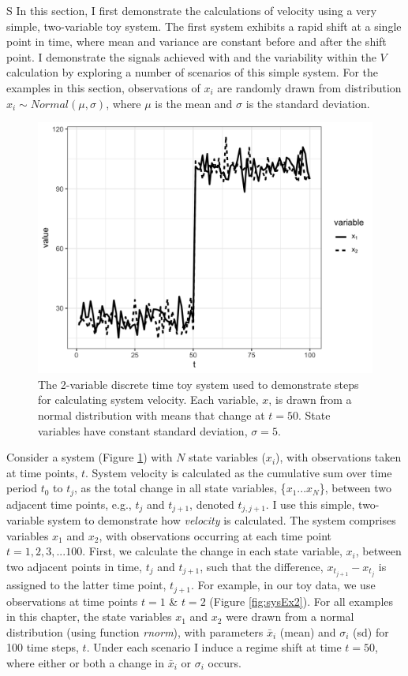 \documentclass[print]{nuthesis}
\begin{document}
S
In this section, I first demonstrate the calculations of velocity using a very simple, two-variable toy system. The first system exhibits a rapid shift at a single point in time, where mean and variance are constant before and after the shift point. I demonstrate the signals achieved with and the variability within the \(V\) calculation by exploring a number of scenarios of this simple system. For the examples in this section, observations of \(x_i\) are randomly drawn from distribution \(x_i\sim Normal(\mu, \sigma)\), where \(\mu\) is the mean and \(\sigma\) is the standard deviation.
\begin{figure}
\includegraphics[width=0.85\linewidth]{./chapterFiles/velocity/figsCalledInDiss/sysEx} \caption{The 2-variable discrete time toy system used to demonstrate steps for calculating system velocity. Each variable, $x$, is drawn from a normal distribution with means that change at $t = 50$. State variables have constant standard deviation, $\sigma = 5$.}\label{fig:sysEx}
\end{figure}
Consider a system (Figure \ref{fig:sysEx}) with \(N\) state variables (\(x_i\)), with observations taken at time points, \(t\). System velocity is calculated as the cumulative sum over time period \(t_0\) to \(t_j\), as the total change in all state variables, \{\(x_1 ...x_N\)\}, between two adjacent time points, e.g., \(t_j\) and \(t_{j+1}\), denoted \(t_{j,j+1}\). I use this simple, two-variable system to demonstrate how \emph{velocity} is calculated. The system comprises variables \(x_1\) and \(x_2\), with observations occurring at each time point \(t = {1,2,3,...100}\). First, we calculate the change in each state variable, \(x_i\), between two adjacent points in time, \(t_j\) and \(t_{j+1}\), such that the difference, \(x_{t_{j+1}} - x_{t_j}\) is assigned to the latter time point, \(t_{j+1}\). For example, in our toy data, we use observations at time points \(t = 1\) \& \(t=2\) (Figure \ref{fig:sysEx2}). For all examples in this chapter, the state variables \(x_1\) and \(x_2\) were drawn from a normal distribution (using function \emph{rnorm}), with parameters \(\bar{x}_i\) (mean) and \(\sigma_i\) (sd) for 100 time steps, \(t\). Under each scenario I induce a regime shift at time \(t=50\), where either or both a change in \(\bar{x}_i\) or \(\sigma_i\) occurs.
\end{document}
